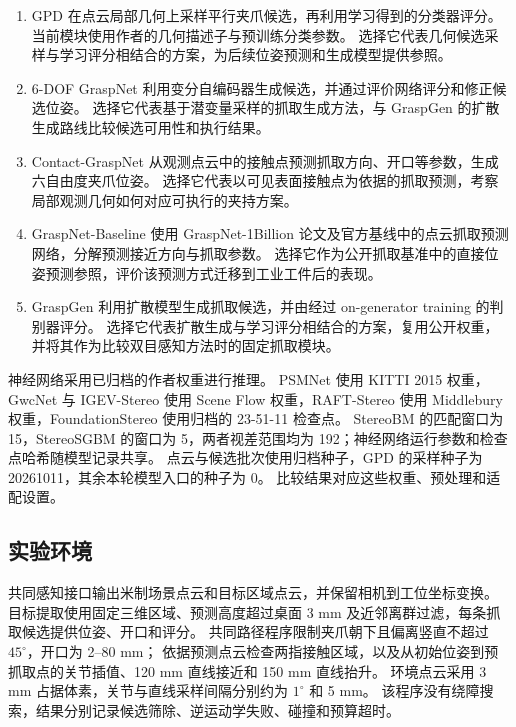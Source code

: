 \documentclass[UTF8,fontset=fandol,a4paper,11pt]{ctexart}
\newcommand{\qyb}[1]{#1}
\begin{document}
\begin{enumerate}
\item GPD 在点云局部几何上采样平行夹爪候选，再利用学习得到的分类器评分\cite{tenpas2017}。
当前模块使用作者的几何描述子与预训练分类参数。
选择它代表几何候选采样与学习评分相结合的方案，为后续位姿预测和生成模型提供参照。
\item 6-DOF GraspNet 利用变分自编码器生成候选，并通过评价网络评分和修正候选位姿\cite{mousavian2019}。
选择它代表基于潜变量采样的抓取生成方法，与 GraspGen 的扩散生成路线比较候选可用性和执行结果。
\item Contact-GraspNet 从观测点云中的接触点预测抓取方向、开口等参数，生成六自由度夹爪位姿\cite{sundermeyer2021}。
选择它代表以可见表面接触点为依据的抓取预测，考察局部观测几何如何对应可执行的夹持方案。
\item GraspNet-Baseline 使用 GraspNet-1Billion 论文及官方基线中的点云抓取预测网络，分解预测接近方向与抓取参数\cite{fang2020}。
选择它作为公开抓取基准中的直接位姿预测参照，评价该预测方式迁移到工业工件后的表现。
\item GraspGen 利用扩散模型生成抓取候选，并由经过 on-generator training 的判别器评分\cite{murali2026}。
选择它代表扩散生成与学习评分相结合的方案，复用公开权重，并将其作为比较双目感知方法时的固定抓取模块。
\end{enumerate}

神经网络采用已归档的作者权重进行推理。
PSMNet 使用 KITTI 2015 权重，GwcNet 与 IGEV-Stereo 使用 Scene Flow 权重，RAFT-Stereo 使用 Middlebury 权重，FoundationStereo 使用归档的 23-51-11 检查点。
StereoBM 的匹配窗口为 15，StereoSGBM 的窗口为 5，两者视差范围均为 192；神经网络运行参数和检查点哈希随模型记录共享。
点云与候选批次使用归档种子，GPD 的采样种子为 20261011，其余本轮模型入口的种子为 0。
比较结果对应这些权重、预处理和适配设置。


\subsection{\qyb{实验环境}}

共同感知接口输出米制场景点云和目标区域点云，并保留相机到工位坐标变换。
目标提取使用固定三维区域、预测高度超过桌面 3 mm 及近邻离群过滤，每条抓取候选提供位姿、开口和评分。
共同路径程序限制夹爪朝下且偏离竖直不超过 $45^\circ$，开口为 2--80 mm；
依据预测点云检查两指接触区域，以及从初始位姿到预抓取点的关节插值、120 mm 直线接近和 150 mm 直线抬升。
环境点云采用 3 mm 占据体素，关节与直线采样间隔分别约为 $1^\circ$ 和 5 mm。
该程序没有绕障搜索，结果分别记录候选筛除、逆运动学失败、碰撞和预算超时。
\end{document}
